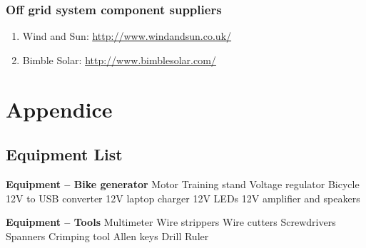 \documentclass{article}
\theoremstyle{definition}
\theoremstyle{definition}
\theoremstyle{remark}
\begin{document}

  \subsubsection{Off grid system component suppliers} %
  \label{ssub:off_grid_system_component_suppliers}

    \begin{enumerate}[resume]
      \item Wind and Sun: \href{http://www.windandsun.co.uk/}{\underline{http://www.windandsun.co.uk/}}
      \item Bimble Solar: \href{http://www.bimblesolar.com/}{\underline{http://www.bimblesolar.com/}}
    \end{enumerate}
  


\newpage

{\color{blue}\section{Appendice}} %
\label{sec:appendice}

  {\color{blue}\subsection{Equipment List}} %
  \label{sub:equipment_list}

    \textbf{Equipment – Bike generator}
    Motor \newline
    Training stand \newline
    Voltage regulator \newline
    Bicycle \newline
    12V to USB converter \newline
    12V laptop charger \newline
    12V LEDs \newline
    12V amplifier and speakers

    \textbf{Equipment – Tools} \newline
    Multimeter \newline
    Wire strippers \newline
    Wire cutters \newline
    Screwdrivers \newline
    Spanners \newline
    Crimping tool \newline
    Allen keys \newline
    Drill \newline
    Ruler
\end{document}
